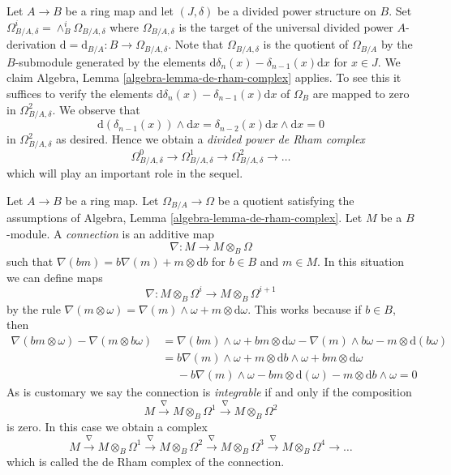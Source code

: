 \begin{remark}
\label{remark-divided-powers-de-rham-complex}
Let $A \to B$ be a ring map and let $(J, \delta)$ be a divided power
structure on $B$. Set
$\Omega_{B/A, \delta}^i = \wedge^i_B \Omega_{B/A, \delta}$
where $\Omega_{B/A, \delta}$ is the target of the universal divided power
$A$-derivation $\text{d} = \text{d}_{B/A} : B \to \Omega_{B/A, \delta}$.
Note that $\Omega_{B/A, \delta}$ is the quotient of $\Omega_{B/A}$ by the
$B$-submodule generated by the elements
$\text{d}\delta_n(x) - \delta_{n - 1}(x)\text{d}x$ for $x \in J$.
We claim Algebra, Lemma \ref{algebra-lemma-de-rham-complex} applies.
To see this it suffices to verify the elements
$\text{d}\delta_n(x) - \delta_{n - 1}(x)\text{d}x$
of $\Omega_B$ are mapped to zero in $\Omega^2_{B/A, \delta}$.
We observe that
$$
\text{d}(\delta_{n - 1}(x)) \wedge \text{d}x
= \delta_{n - 2}(x) \text{d}x \wedge \text{d}x = 0
$$
in $\Omega^2_{B/A, \delta}$ as desired. Hence we obtain a
{\it divided power de Rham complex}
$$
\Omega^0_{B/A, \delta} \to \Omega^1_{B/A, \delta} \to
\Omega^2_{B/A, \delta} \to \ldots
$$
which will play an important role in the sequel.
\end{remark}

\begin{remark}
\label{remark-connection}
Let $A \to B$ be a ring map. Let $\Omega_{B/A} \to \Omega$
be a quotient satisfying the assumptions of
Algebra, Lemma \ref{algebra-lemma-de-rham-complex}.
Let $M$ be a $B$-module. A {\it connection} is an additive map
$$
\nabla : M \longrightarrow M \otimes_B \Omega
$$
such that $\nabla(bm) = b \nabla(m) + m \otimes \text{d}b$
for $b \in B$ and $m \in M$. In this situation we can define maps
$$
\nabla : M \otimes_B \Omega^i \longrightarrow M \otimes_B \Omega^{i + 1}
$$
by the rule $\nabla(m \otimes \omega) = \nabla(m) \wedge \omega +
m \otimes \text{d}\omega$. This works because if $b \in B$, then
\begin{align*}
\nabla(bm \otimes \omega) - \nabla(m \otimes b\omega)
& =
\nabla(bm) \wedge \omega + bm \otimes \text{d}\omega
- \nabla(m) \wedge b\omega - m \otimes \text{d}(b\omega) \\
& =
b\nabla(m) \wedge \omega + m \otimes \text{d}b \wedge \omega
+ bm \otimes \text{d}\omega \\
& \ \ \ \ \ \ - b\nabla(m) \wedge \omega - bm \otimes \text{d}(\omega)
- m \otimes \text{d}b \wedge \omega = 0
\end{align*}
As is customary we say the connection is {\it integrable} if and
only if the composition
$$
M \xrightarrow{\nabla} M \otimes_B \Omega^1
\xrightarrow{\nabla} M \otimes_B \Omega^2
$$
is zero. In this case we obtain a complex
$$
M \xrightarrow{\nabla} M \otimes_B \Omega^1
\xrightarrow{\nabla} M \otimes_B \Omega^2
\xrightarrow{\nabla} M \otimes_B \Omega^3
\xrightarrow{\nabla} M \otimes_B \Omega^4 \to \ldots
$$
which is called the de Rham complex of the connection.
\end{remark}

